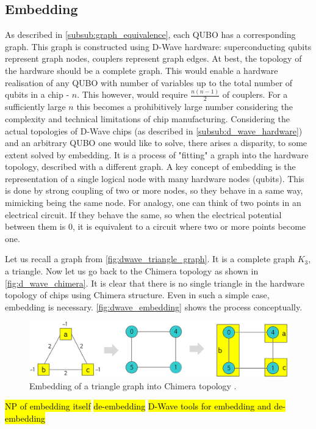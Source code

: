 \subsection{Embedding}
\label{sub:embedding}
As described in \autoref{subsub:graph_equivalence}, each QUBO has a corresponding graph. This graph is constructed using D-Wave hardware: superconducting qubits represent graph nodes, couplers represent graph edges. At best, the topology of the hardware should be a complete graph. This would enable a hardware realisation of any QUBO with number of variables up to the total number of qubits in a chip - $n$. This however, would require $\frac{n(n-1)}{2}$ of couplers. For a sufficiently large $n$ this becomes a prohibitively large number considering the complexity and technical limitations of chip manufacturing. Considering the actual topologies of D-Wave chips (as described in \autoref{subsub:d_wave_hardware}) and an arbitrary QUBO one would like to solve, there arises a disparity, to some extent solved by embedding. It is a process of "fitting" a graph into the hardware topology, described with a different graph. A key concept of embedding is the representation of a single logical node with many hardware nodes (qubits). This is done by strong coupling of two or more nodes, so they behave in a same way, mimicking being the same node. For analogy, one can think of two points in an electrical circuit. If they behave the same, so when the electrical potential between them is $0$, it is equivalent to a circuit where two or more points become one.

Let us recall a graph from \autoref{fig:dwave_triangle_graph}. It is a complete graph $K_3$, a triangle. Now let us go back to the Chimera topology as shown in \autoref{fig:d_wave_chimera}. It is clear that there is no single triangle in the hardware topology of chips using Chimera structure. Even in such a simple case, embedding is necessary. \autoref{fig:dwave_embedding} shows the process conceptually. 

\begin{figure}
	\centering
	\includegraphics[width=0.8\columnwidth]{graphics/dwave_embedding.png}
	\caption{Embedding of a triangle graph into Chimera topology \cite{d-wave_inc_d-wave_2022}.}
    \label{fig:dwave_embedding}
\end{figure}

\hl{NP of embedding itself}
\hl{de-embedding}
\hl{D-Wave tools for embedding and de-embedding}